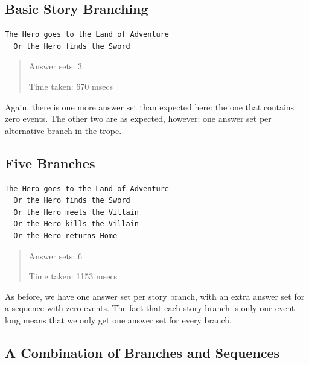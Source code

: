\documentclass[11pt]{report}
\begin{document}

\subsection{Basic Story Branching}

\begin{lstlisting}[label={lst:ex-branch1}, caption={Two branches}]
The Hero goes to the Land of Adventure
  Or the Hero finds the Sword
\end{lstlisting}

\begin{quote}
  Answer sets: 3

  Time taken: 670 msecs
\end{quote}

Again, there is one more answer set than expected here: the one that contains
zero events. The other two are as expected, however: one answer set per
alternative branch in the trope.

\subsection{Five Branches}

\begin{lstlisting}[label={lst:ex-branch2}, caption={Five branches}]
The Hero goes to the Land of Adventure
  Or the Hero finds the Sword
  Or the Hero meets the Villain
  Or the Hero kills the Villain
  Or the Hero returns Home
\end{lstlisting}

\begin{quote}
  Answer sets: 6

  Time taken: 1153 msecs
\end{quote}

As before, we have one answer set per story branch, with an extra answer set for
a sequence with zero events. The fact that each story branch is only one event
long means that we only get one answer set for every branch.

\subsection{A Combination of Branches and Sequences}
\end{document}
